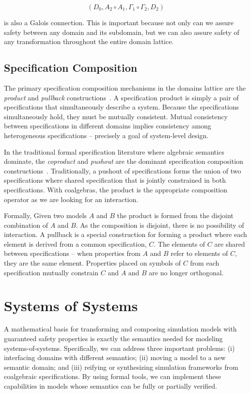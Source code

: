\documentclass[12pt]{article}
\begin{document}
\[(D_0, A_2 \circ A_1, \Gamma_1 \circ \Gamma_2, D_2)\]

\noindent is also a Galois connection.  This is important because not only can we assure
safety between any domain and its subdomain, but we can also assure safety of any
transformation throughout the entire domain lattice.

\subsection{Specification Composition}

The primary specification composition mechanisms in the domains lattice are the
\emph{product} and \emph{pullback} constructions~\cite{Ehrig:85:Fundamentals-of}.  A
specification product is simply a pair of specifications that simultaneously describe a
system.  Because the specifications simultaneously hold, they must be mutually consistent.
Mutual consistency between specifications in different domains implies consistency among
heterogeneous specifications -- precisely a goal of system-level design.

In the traditional formal specification literature where algebraic semantics dominate, the
\emph{coproduct} and \emph{pushout} are the dominant specification composition
constructions~\cite{Ehrig:85:Fundamentals-of,Smith:93:Constructing-Sp,Smith:90:KIDS:-A-Semiaut}.
Traditionally, a pushout of specifications forms the union of two specifications where
shared specification that is jointly constrained in both specifications.  With coalgebras,
the product is the appropriate composition operator as we are looking for an interaction.

Formally, Given two models $A$ and $B$ the product is formed from the disjoint combination
of $A$ and $B$. As the composition is disjoint, there is no possibility of interaction.  A
pullback is a special construction for forming a product where each element is derived
from a common specification, $C$.  The elements of $C$ are shared between specifications
-- when properties from $A$ and $B$ refer to elements of $C$, they are the same element.
Properties placed on symbols of $C$ from each specification mutually constrain $C$ and $A$
and $B$ are no longer orthogonal.

\section{Systems of Systems}

A mathematical basis for transforming and composing simulation models with guaranteed
safety properties is exactly the semantics needed for modeling systems-of-systems.
Specifically, we can address three important problems: (i) interfacing domains with
different semantics; (ii) moving a model to a new semantic domain; and (iii) reifying or
synthesizing simulation frameworks from coalgebraic specifications.  By using formal
tools, we can implement these capabilities in models whose semantics can be fully or
partially verified.
\end{document}
